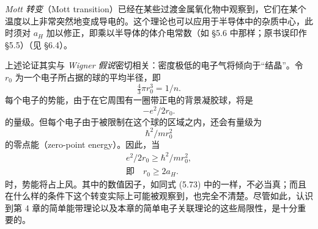 \emph{Mott 转变}（Mott transition）已经在某些过渡金属氧化物中观察到，它们在某个温度以上非常突然地变成导电的。这个理论也可以应用于半导体中的杂质中心，此时须对 $a_{H}$ 加以修正，即乘以半导体的体介电常数（如 §5.6 中那样；原书误印作 §5.5）（见 §6.4）。

上述论证其实与 \emph{Wigner 假说}密切相关：密度极低的电子气将倾向于“结晶”。令 $r_{0}$ 为一个电子所占据的球的平均半径，即
\begin{equation*}
\tfrac{4}{3}\pi r_{0}^{3}=1/n. \tag{5.74}
\end{equation*}
每个电子的势能，由于在它周围有一圈带正电的背景凝胶球，将是
\begin{equation*}
-e^{2}/2r_{0}. \tag{5.75}
\end{equation*}
的量级。但每个电子由于被限制在这个球的区域之内，还会有量级为
\begin{equation*}
\hbar^{2}/mr_{0}^{2} \tag{5.76}
\end{equation*}
的零点能（zero-point energy）。因此，当
\begin{gather*}
e^{2}/2r_{0}\geqslant\hbar^{2}/mr_{0}^{2}, \\
\text{即}\quad r_{0}\geqslant 2a_{H}. \tag{5.77}
\end{gather*}
时，势能将占上风。其中的数值因子，如同式 (5.73) 中的一样，不必当真；而且在什么样的条件下这个转变实际上可能被观察到，也完全不清楚。尽管如此，认识到第 4 章的简单能带理论以及本章的简单电子关联理论的这些局限性，是十分重要的。
